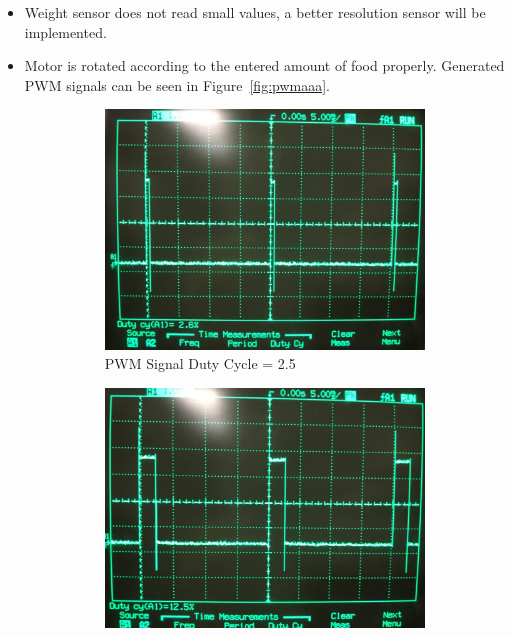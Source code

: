 \begin{itemize}
\item Weight sensor does not read small values, a better resolution sensor will be implemented.
\item Motor is rotated according to the entered amount of food properly. Generated PWM signals can be seen in Figure~\ref{fig:pwmaaa}.
\begin{figure}[ht]
     \centering
     \begin{subfigure}[b]{0.49\textwidth}
     \includegraphics[width=\linewidth]{content/050_electrical_design/pwm25.jpeg}
     \caption{PWM Signal Duty Cycle = 2.5}
     \label{fig:pwm25}
     \end{subfigure}
     \begin{subfigure}[b]{0.49\textwidth}
     \includegraphics[width=\linewidth]{content/050_electrical_design/pwm125.jpeg}

\end{subfigure}
\end{figure}
\end{itemize}
